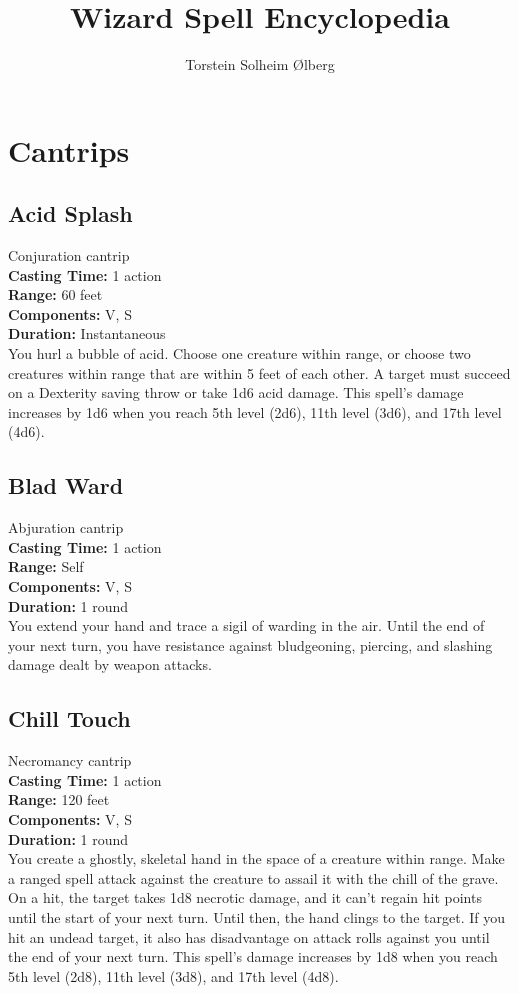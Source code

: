\documentclass[11pt, A4paper, english]{article}
\author{Torstein Solheim Ølberg}
\title{Wizard Spell Encyclopedia}
\begin{document}
\maketitle

\tableofcontents

	\section{Cantrips}
		\subsection{Acid Splash}
Conjuration cantrip \\
\textbf{Casting Time:} 1 action \\
\textbf{Range:} 60 feet \\
\textbf{Components:} V, S \\
\textbf{Duration:} Instantaneous \\
You hurl a bubble of acid. Choose one creature within range, or choose two creatures within range that are within 5 feet of each other. A target must succeed on a Dexterity saving throw or take 1d6 acid damage. This spell's damage increases by 1d6 when you reach 5th level (2d6), 11th level (3d6), and 17th level (4d6).

		\subsection{Blad Ward}
Abjuration cantrip \\
\textbf{Casting Time:} 1 action \\
\textbf{Range:} Self \\
\textbf{Components:} V, S \\
\textbf{Duration:} 1 round \\
You extend your hand and trace a sigil of warding in the air. Until the end of your next turn, you have resistance against bludgeoning, piercing, and slashing damage dealt by weapon attacks.

		\subsection{Chill Touch}
Necromancy cantrip \\
\textbf{Casting Time:} 1 action \\
\textbf{Range:} 120 feet \\
\textbf{Components:} V, S \\
\textbf{Duration:} 1 round \\
You create a ghostly, skeletal hand in the space of a creature within range. Make a ranged spell attack against the creature to assail it with the chill of the grave. On a hit, the target takes 1d8 necrotic damage, and it can’t regain hit points until the start of your next turn. Until then, the hand clings to the target. If you hit an undead target, it also has disadvantage on attack rolls against you until the end of your next turn. This spell’s damage increases by 1d8 when you reach 5th level (2d8),  11th level (3d8), and 17th level (4d8).
\end{document}
